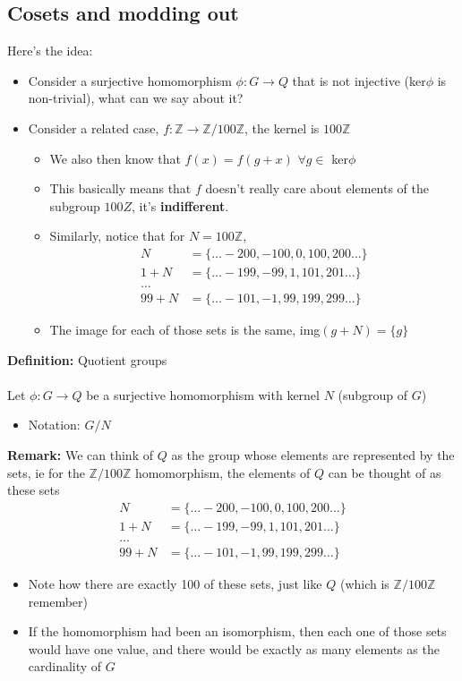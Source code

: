 \documentclass{article}
\newcommand{\Z}{\mathbb{Z}}
\begin{document}
\subsection{Cosets and modding out}
Here's the idea:
\begin{itemize}
	\item Consider a surjective homomorphism $\phi: G\to Q$ that is not injective (ker$\phi$ is non-trivial), what can we say about it?
	\item Consider a related case, $f: \Z\to \Z/{100\Z}$, the kernel is $100\Z$
		\begin{itemize}
			\item We also then know that $f(x) = f(g + x)$ $\forall g\in$ ker$\phi$
			\item This basically means that $f$ doesn't really care about elements of the subgroup $100Z$, it's \textbf{indifferent}.
			\item Similarly, notice that for $N=100\Z$,
				\begin{align}	
					N &= \{\ldots-200,-100,0,100,200\ldots\} \\
					1 + N &= \{\ldots-199,-99,1,101,201\ldots\}\\
					\ldots \\
					99 + N &= \{\ldots-101,-1,99,199,299\ldots\}
				\end{align}
			\item The image for each of those sets is the same, img$(g + N) = \{g\}$
		\end{itemize}
\end{itemize}
\newpage
\begin{definition} 
\textbf{Definition:} Quotient groups \\
~\\
Let $\phi: G\to Q$ be a surjective homomorphism with kernel $N$ (subgroup of $G$)
\begin{itemize}
	\item Notation: $G/N$ 
\end{itemize}
\end{definition}
\begin{remark} 
\textbf{Remark:} We can think of $Q$ as the group whose elements are represented by the sets, ie for the $\Z/100\Z$ homomorphism, the elements of $Q$ can be thought of as these sets 
	\begin{align}	
		N &= \{\ldots-200,-100,0,100,200\ldots\} \\
		1 + N &= \{\ldots-199,-99,1,101,201\ldots\}\\
		\ldots \\
		99 + N &= \{\ldots-101,-1,99,199,299\ldots\}
	\end{align}
	\begin{itemize}
		\item Note how there are exactly 100 of these sets, just like $Q$ (which is $\Z /100\Z$ remember)
		\item If the homomorphism had been an isomorphism, then each one of those sets would have one value, and there would be exactly as many elements as the cardinality of $G$
	\end{itemize}
\end{remark}
\end{document}
